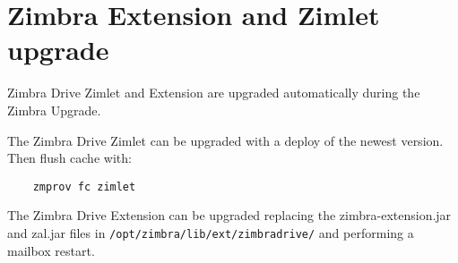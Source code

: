 \section{Zimbra Extension and Zimlet upgrade}
\begin{warning}
    Zimbra Drive Zimlet and Extension are upgraded automatically during the Zimbra Upgrade.
\end{warning}

The Zimbra Drive Zimlet can be upgraded with a deploy of the newest version.\\
Then flush cache with:
\begin{verbatim}
    zmprov fc zimlet
\end{verbatim}

The Zimbra Drive Extension can be upgraded replacing the zimbra-extension.jar and zal.jar files in \texttt{/opt/zimbra/lib/ext/zimbradrive/} and performing a mailbox restart.